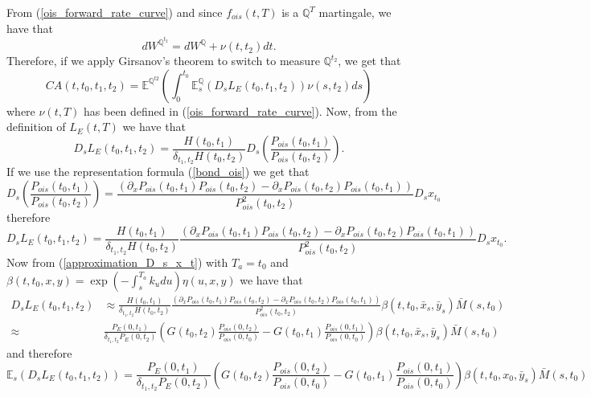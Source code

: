 \documentclass[a4paper,10pt]{article}
\newcommand{\1}{\mathbf{1}}
\begin{document}
From (\ref{ois_forward_rate_curve}) and since $f_{ois}(t,T)$ is a $\mathbb{Q}^{T}$ martingale, we have that
\begin{equation*}
dW^{\mathbb{Q}^{t_2}} = dW^{\mathbb{Q}} + \nu(t,t_2) dt. 
\end{equation*}
Therefore, if we apply Girsanov's theorem to switch to measure $\mathbb{Q}^{t_2}$, we get that
\begin{equation}\label{ca_general_future}
CA(t, t_0, t_1, t_2) = \mathbb{E}^{\mathbb{Q}^{t2}}\left(\int_{0}^{t_0} \mathbb{E}^{\mathbb{Q}}_{s}\left(D_s L_{E}(t_0,t_1,t_2) \right) \nu(s,t_2) ds \right)
\end{equation}
where $\nu(t,T)$ has been defined in (\ref{ois_forward_rate_curve}). Now, from the definition of $L_{E}(t,T)$ we have that
\begin{equation*}
D_s L_{E}(t_0,t_1,t_2) = \frac{H(t_0,t_1)}{\delta_{t_1,t_2}H(t_0,t_2)} D_s \left(\frac{P_{ois}(t_0,t_1)}{P_{ois}(t_0,t_2)}\right). 
\end{equation*}
If we use the representation formula (\ref{bond_ois}) we get that
\begin{equation*}
D_s \left(\frac{P_{ois}(t_0,t_1)}{P_{ois}(t_0,t_2)}\right) = \frac{\left(\partial_{x}P_{ois}(t_0,t_1)P_{ois}(t_0,t_2) - \partial_{x}P_{ois}(t_0,t_2) P_{ois}(t_0,t_1) \right)}{P^{2}_{ois}(t_0,t_2)} D_s x_{t_0}
\end{equation*}
therefore
\begin{equation}\label{malliavin_derive_L}
D_s L_{E}(t_0,t_1,t_2) = \frac{H(t_0,t_1)}{\delta_{t_1,t_2}H(t_0,t_2)}\frac{\left(\partial_{x}P_{ois}(t_0,t_1)P_{ois}(t_0,t_2) - \partial_{x}P_{ois}(t_0,t_2) P_{ois}(t_0,t_1) \right)}{P^{2}_{ois}(t_0,t_2)} D_s x_{t_0}. 
\end{equation}
Now from (\ref{approximation_D_s_x_t}) with $T_a=t_0$ and $\beta(t,t_0,x,y) = \exp\left(-\int_{s}^{T_a}k_u du \right) \eta(u,x,y)$ we have that
\begin{align*}
D_s L_{E}(t_0,t_1,t_2) &\approx \frac{H(t_0,t_1)}{\delta_{t_1,t_2}H(t_0,t_2)}\frac{\left(\partial_{x}P_{ois}(t_0,t_1)P_{ois}(t_0,t_2) - \partial_{x}P_{ois}(t_0,t_2) P_{ois}(t_0,t_1) \right)}{P^{2}_{ois}(t_0,t_2)} \beta(t,t_0,\bar{x}_s,\bar{y}_s)\bar{M}(s,t_0) \nonumber \\
\approx& \frac{P_{E}(0,t_1)}{\delta_{t_1,t_2} P_{E}(0,t_2)} \left(G(t_0,t_2) \frac{P_{ois}(0,t_2)}{P_{ois}(0,t_0)} - G(t_0,t_1) \frac{P_{ois}(0,t_1)}{P_{ois}(0,t_0)} \right)\beta(t,t_0,\bar{x}_s,\bar{y}_s)\bar{M}(s,t_0)
\end{align*}
and therefore
\begin{equation}\label{approximation_clarkocone}
\mathbb{E}_s\left( D_s L_{E}(t_0,t_1,t_2) \right) = \frac{P_{E}(0,t_1)}{\delta_{t_1,t_2} P_{E}(0,t_2)} \left(G(t_0,t_2) \frac{P_{ois}(0,t_2)}{P_{ois}(0,t_0)} - G(t_0,t_1) \frac{P_{ois}(0,t_1)}{P_{ois}(0,t_0)}\right)\beta(t,t_0,x_0,\bar{y}_s)\bar{M}(s,t_0)
\end{equation}
\end{document}
